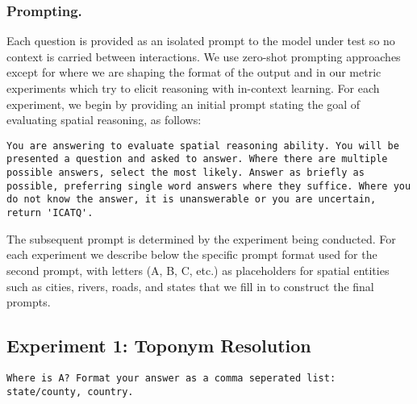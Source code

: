 \subsubsection{Prompting.} 
Each question is provided as an isolated prompt to the model under test so no context is carried between interactions.
We use zero-shot prompting approaches except for where we are shaping the format of the output and in our metric experiments which try to elicit reasoning with in-context learning. 
For each experiment, we begin by providing an initial prompt stating the goal of evaluating spatial reasoning, as follows:

\begin{lstlisting}[title=Prompt 1: Initial System Prompt]
    You are answering to evaluate spatial reasoning ability. You will be presented a question and asked to answer. Where there are multiple possible answers, select the most likely. Answer as briefly as possible, preferring single word answers where they suffice. Where you do not know the answer, it is unanswerable or you are uncertain, return 'ICATQ'.
\end{lstlisting}

\noindent The subsequent prompt is determined by the experiment being conducted.
For each experiment we describe below the specific prompt format used for the second prompt, with letters (A, B, C, etc.) as placeholders for spatial entities such as cities, rivers, roads, and states that we fill in to construct the final prompts.


\subsection{Experiment 1: Toponym Resolution}

\begin{lstlisting}[title=Prompt 2: Toponym Resolution Prompt]
    Where is A? Format your answer as a comma seperated list: state/county, country.
\end{lstlisting}

